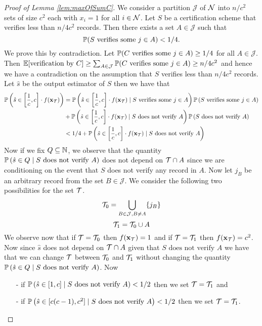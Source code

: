 \begin{proof}[Proof of Lemma \ref{lem:maxOfSumC}]
  We consider a partition $\mathcal{J}$ of $\mathcal{N}$ into $n/c^2$ sets of size $c^2$ each with $x_i = 1$ for all $i \in \mathcal{N}$. Let $S$ be a certification scheme that verifies less than $n / 4 c^2$ records. Then there 
exists a set $A \in \mathcal{J}$ such that
\[ \mathbb{P}( S \text{ verifies some } j \in A ) < 1/4. \]
\noindent We prove this by contradiction. Let $\mathbb{P}( C \text{ verifies some } j \in A ) \ge 1/4$ for all $A \in \mathcal{J}$. Then 
$\mathbb{E}[\text{verification by } C] \ge \sum_{A \in \mathcal{J}} \mathbb{P}( C \text{ verifies some } j \in A ) \ge n / 4 c^2$ and hence we have a contradiction on the assumption that $S$ verifies less than $n / 4 c^2$ records. Let $\hat{s}$
be the output estimator of $S$ then we have that
\begin{align*}
  \mathbb{P}\left(\hat{s} \in \left[\frac{1}{c}, c\right] \cdot f(\mathbf{x}_{\mathcal{T}})\right) & = \mathbb{P}\left(\hat{s} \in \left[\frac{1}{c}, c\right] \cdot f(\mathbf{x}_{\mathcal{T}}) \mid  S \text{ verifies some } j \in A\right) \mathbb{P}\left( S \text{ verifies some } j \in A\right) \\
                                                                         & + \mathbb{P}\left(\hat{s} \in \left[\frac{1}{c}, c\right] \cdot f(\mathbf{x}_{\mathcal{T}}) \mid  S \text{ does not verify } A\right) \mathbb{P}\left( S \text{ does not verify } A\right) \\
                                                                         & < 1/4 + \mathbb{P}\left(\hat{s} \in \left[\frac{1}{c}, c\right] \cdot f(\mathbf{x}_{\mathcal{T}}) \mid  S \text{ does not verify } A\right)
\end{align*}
\noindent Now if we fix $Q \subseteq \mathbb{N}$, we observe that the quantity $\mathbb{P}\left(\hat{s} \in Q \mid  S \text{ does not verify } A\right)$ does not depend on $\mathcal{T} \cap A$ since we are conditioning on the event that $S$
does not verify any record in $A$. Now let $j_B$ be an arbitrary record from the set $B \in \mathcal{J}$. We consider the following two possibilities for the set $\mathcal{T}$.
\[ \mathcal{T}_0 = \bigcup_{B \in \mathcal{J}, B \neq A} \{j_B\} \]
\[ \mathcal{T}_1 = \mathcal{T}_0 \cup A \]
\noindent We observe now that if $\mathcal{T} = \mathcal{T}_0$ then $f(\mathbf{x}_{\mathcal{T}}) = 1$ and if $\mathcal{T} = \mathcal{T}_1$ then $f(\mathbf{x}_{\mathcal{T}}) = c^2$. Now since $\hat{s}$ does not depend on $\mathcal{T} \cap A$ given that $S \text{ does not verify } A$ we have that we 
can change $\mathcal{T}$ between $\mathcal{T}_0$ and $\mathcal{T}_1$ without changing the quantity $\mathbb{P}\left(\hat{s} \in Q \mid  S \text{ does not verify } A\right)$. Now 
\begin{itemize}
  \item[-] if $\mathbb{P}\left(\hat{s} \in [1, c] \mid  S \text{ does not verify } A\right) < 1/2$ then we set $\mathcal{T} = \mathcal{T}_1$ and 
  \item[-] if $\mathbb{P}\left(\hat{s} \in [c(c - 1), c^2] \mid  S \text{ does not verify } A\right) < 1/2$ then we set $\mathcal{T} = \mathcal{T}_1$. 
\end{itemize}


\end{proof}
